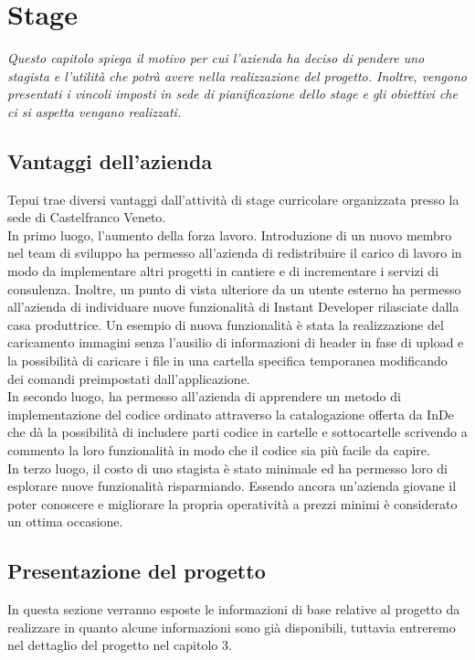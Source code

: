 \chapter{Stage}
\textit{Questo capitolo spiega il motivo per cui l'azienda ha deciso di pendere uno stagista e l'utilità che potrà avere nella realizzazione del progetto. Inoltre, vengono presentati i vincoli imposti in sede di pianificazione dello stage e gli obiettivi che ci si aspetta vengano realizzati.}

\section{Vantaggi dell'azienda}
Tepui trae diversi vantaggi dall'attività di stage curricolare organizzata presso la sede di Castelfranco Veneto.\\

In primo luogo, l'aumento della forza lavoro. Introduzione di un nuovo membro nel team di sviluppo ha permesso all'azienda di redistribuire il carico di lavoro in modo da implementare altri progetti in cantiere e di incrementare i servizi di consulenza. Inoltre, un punto di vista ulteriore da un utente esterno ha permesso all'azienda di individuare nuove funzionalità di Instant Developer rilasciate dalla casa produttrice.
Un esempio di nuova funzionalità è stata la realizzazione del caricamento immagini senza l'ausilio di informazioni di header in fase di upload e la possibilità di caricare i file in una cartella specifica temporanea modificando dei comandi preimpostati dall'applicazione.
\\

In secondo luogo, ha permesso all'azienda di apprendere un metodo di implementazione del codice ordinato attraverso la catalogazione offerta da InDe che dà la possibilità di includere parti codice in cartelle e sottocartelle scrivendo a commento la loro funzionalità in modo che il codice sia più facile da capire.
\\

In terzo luogo, il costo di uno stagista è stato minimale ed ha permesso loro di esplorare nuove funzionalità risparmiando. Essendo ancora un'azienda giovane il poter conoscere e migliorare la propria operatività a prezzi minimi è considerato un ottima occasione. 


\section{Presentazione del progetto}
In questa sezione verranno esposte le informazioni di base relative al progetto da realizzare in quanto alcune informazioni sono già disponibili, tuttavia entreremo nel dettaglio del progetto nel capitolo 3.

